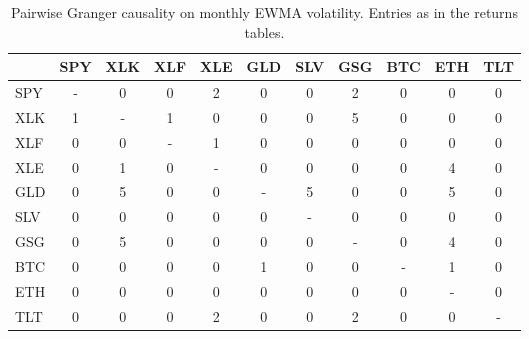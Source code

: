 \begin{table}[H]
\centering
\small
\begin{tabular}{lcccccccccc}
\toprule
 & SPY & XLK & XLF & XLE & GLD & SLV & GSG & BTC & ETH & TLT \\
\midrule
SPY & - & 0 & 0 & 2 & 0 & 0 & 2 & 0 & 0 & 0 \\
XLK & 1 & - & 1 & 0 & 0 & 0 & 5 & 0 & 0 & 0 \\
XLF & 0 & 0 & - & 1 & 0 & 0 & 0 & 0 & 0 & 0 \\
XLE & 0 & 1 & 0 & - & 0 & 0 & 0 & 0 & 4 & 0 \\
GLD & 0 & 5 & 0 & 0 & - & 5 & 0 & 0 & 5 & 0 \\
SLV & 0 & 0 & 0 & 0 & 0 & - & 0 & 0 & 0 & 0 \\
GSG & 0 & 5 & 0 & 0 & 0 & 0 & - & 0 & 4 & 0 \\
BTC & 0 & 0 & 0 & 0 & 1 & 0 & 0 & - & 1 & 0 \\
ETH & 0 & 0 & 0 & 0 & 0 & 0 & 0 & 0 & - & 0 \\
TLT & 0 & 0 & 0 & 2 & 0 & 0 & 2 & 0 & 0 & - \\
\bottomrule
\end{tabular}
\caption{Pairwise Granger causality on monthly EWMA volatility. Entries as in the returns tables.}
\label{tab:vol_monthly}
\end{table}